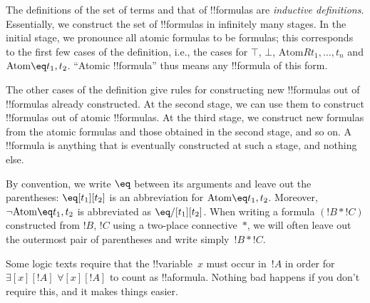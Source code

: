 \documentclass[10pt,a4paper]{article}
\makeatletter
\theoremstyle{plain}
\theoremstyle{definition}
\theoremstyle{remark}
\newenvironment{explain}{}{}
\providecommand{\lforall}{\mathord{\forall}}
\providecommand{\lexists}{\mathord{\exists}}
\providecommand{\ltrue}{\top}
\providecommand{\lfalse}{\bot}
\providecommand{\iftag}[1]{#1}
\providecommand{\Atom}{\mathrm{Atom}}
\providecommand{\iftag}{}
\def\iftag#1#2#3{\iftag@stop{#2}\iftag@more}
\def\iftag@more{\@ifnextchar\bgroup{\iftag@eat}{\relax}}
\def\iftag@eat#1{}
\def\iftag@stop#1{#1}
\makeatother
\begin{document}
\begin{explain}
The definitions of the set of terms and that of !!{formula}s are
\emph{inductive definitions}.  Essentially, we construct the set of
!!{formula}s in infinitely many stages.  In the initial stage, we
pronounce all atomic formulas to be formulas; this corresponds to the
first few cases of the definition, i.e., the cases for
\iftag{prvTrue}{$\ltrue$, }{}%
\iftag{prvFalse}{$\lfalse$, }{}%
$\Atom{R}{t_1,\dots,t_n}$ and $\Atom{\eq}{t_1,t_2}$. ``Atomic
!!{formula}'' thus means any !!{formula} of this form.

The other cases of the definition give rules for constructing new
!!{formula}s out of !!{formula}s already constructed.  At the second
stage, we can use them to construct !!{formula}s out of atomic
!!{formula}s.  At the third stage, we construct new formulas from the
atomic formulas and those obtained in the second stage, and so on.  A
!!{formula} is anything that is eventually constructed at such a
stage, and nothing else.
\end{explain}

By convention, we write $\eq$ between its arguments and leave out the
parentheses: $\eq[t_1][t_2]$ is an abbreviation for
$\Atom{\eq}{t_1,t_2}$.  Moreover, $\lnot \Atom{\eq}{t_1,t_2}$ is
abbreviated as $\eq/[t_1][t_2]$. When writing a formula $(!B \ast !C)$
constructed from $!B$, $!C$ using a two-place connective~$\ast$, we
will often leave out the outermost pair of parentheses and write
simply~$!B \ast !C$.

\begin{intro}
Some logic texts require that the !!{variable}~$x$ must occur in~$!A$
in order for
\iftag{prvEx}{$\lexists[x][!A]$ }{}%
\iftag{notprvEx,notprvAll}{}{and }%
\iftag{prvAll}{$\lforall[x][!A]$ }{}%
to count as
\iftag{notprvEx,notprvAll}{!!a{formula}}{!!{formula}s}.
Nothing bad happens if you don't require this, and it makes things
easier.
\end{intro}
\end{document}
